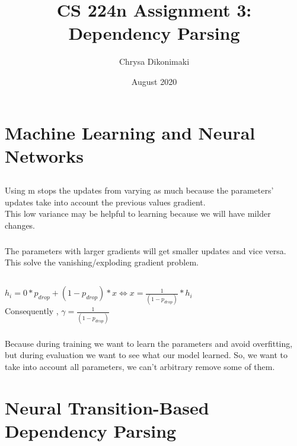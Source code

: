 \documentclass{article}
\title{CS 224n Assignment 3: Dependency Parsing}
\author{Chrysa Dikonimaki}
\date{August 2020}
\begin{document}
\maketitle

\section{Machine Learning and Neural Networks}

\subsection{}
\subsubsection{}
 Using m stops the updates from varying
as much because the parameters' updates take into account the previous values gradient. \\
This low variance may be helpful to learning because we will have milder changes. 

\subsubsection{}
The parameters with larger gradients will get  smaller updates and vice versa. \\
This solve the vanishing/exploding gradient problem.

\subsection{}

\subsubsection{}
$h_i = 0*p_{drop} + (1-p_{drop})*x \Leftrightarrow x = \frac{1}{(1 - p_{drop})}*h_i$   \\
Consequently , $\gamma = \frac{1}{(1 - p_{drop})} $

\subsubsection{}
Because during training we want to learn the parameters and avoid overfitting, but during evaluation we want to see what our model learned. So, we want to take into account all parameters, we can't arbitrary remove some of them.
\section{Neural Transition-Based Dependency Parsing}
\end{document}
